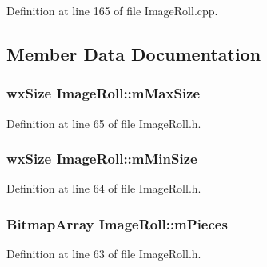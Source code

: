 Definition at line 165 of file Image\+Roll.\+cpp.



\subsection{Member Data Documentation}
\subsubsection[{\texorpdfstring{m\+Max\+Size}{mMaxSize}}]{\setlength{\rightskip}{0pt plus 5cm}wx\+Size Image\+Roll\+::m\+Max\+Size\hspace{0.3cm}{\ttfamily [protected]}}\hypertarget{class_image_roll_ac9896fe08df31541c8b632266662e731}{}\label{class_image_roll_ac9896fe08df31541c8b632266662e731}


Definition at line 65 of file Image\+Roll.\+h.

\subsubsection[{\texorpdfstring{m\+Min\+Size}{mMinSize}}]{\setlength{\rightskip}{0pt plus 5cm}wx\+Size Image\+Roll\+::m\+Min\+Size\hspace{0.3cm}{\ttfamily [protected]}}\hypertarget{class_image_roll_a22362f6b655ee5bdad4a742d50ddb0f2}{}\label{class_image_roll_a22362f6b655ee5bdad4a742d50ddb0f2}


Definition at line 64 of file Image\+Roll.\+h.

\subsubsection[{\texorpdfstring{m\+Pieces}{mPieces}}]{\setlength{\rightskip}{0pt plus 5cm}Bitmap\+Array Image\+Roll\+::m\+Pieces\hspace{0.3cm}{\ttfamily [protected]}}\hypertarget{class_image_roll_abda9941c78abfe466308df2fff3f69fc}{}\label{class_image_roll_abda9941c78abfe466308df2fff3f69fc}


Definition at line 63 of file Image\+Roll.\+h.

